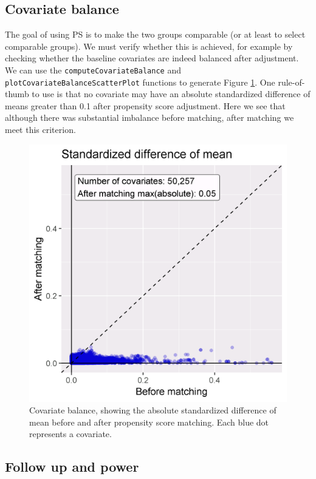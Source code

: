 \documentclass[11pt]{book}
\theoremstyle{definition}
\theoremstyle{definition}
\theoremstyle{definition}
\theoremstyle{remark}
\begin{document}
\hypertarget{covariate-balance}{%
\subsection{Covariate balance}\label{covariate-balance}}

The goal of using PS is to make the two groups comparable (or at least to select comparable groups). We must verify whether this is achieved, for example by checking whether the baseline covariates are indeed balanced after adjustment. We can use the \texttt{computeCovariateBalance} and \texttt{plotCovariateBalanceScatterPlot} functions to generate Figure \ref{fig:balance}. One rule-of-thumb to use is that no covariate may have an absolute standardized difference of means greater than 0.1 after propensity score adjustment. Here we see that although there was substantial imbalance before matching, after matching we meet this criterion. 

\begin{figure}

{\centering \includegraphics[width=0.7\linewidth]{images/PopulationLevelEstimation/balance} 

}

\caption{Covariate balance, showing the absolute standardized difference of mean before and after propensity score matching. Each blue dot represents a covariate.}\label{fig:balance}
\end{figure}

\hypertarget{follow-up-and-power}{%
\subsection{Follow up and power}\label{follow-up-and-power}}
\end{document}
